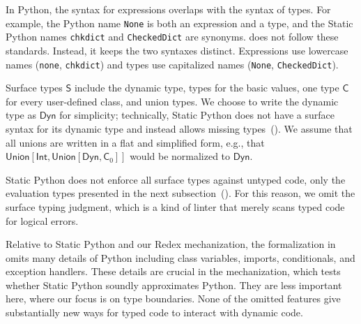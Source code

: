 \documentclass[english,cleveref,crc]{programming}
\newcommand{\SP}{Static Python}
\newcommand{\code}[1]{\texttt{#1}}
\newcommand{\typefont}[1]{\mathsf{#1}}
\newcommand{\paramtype}[2]{#1[#2]}
\newcommand{\sptype}{\typefont{S}}
\newcommand{\sptclass}{\typefont{C}}
\newcommand{\sptint}{\typefont{Int}}
\newcommand{\sptdyn}{\typefont{Dyn}}
\newcommand{\sptunion}[1]{\paramtype{\typefont{Union}}{#1}}
\begin{document}
In Python, the syntax for expressions overlaps with the syntax of types.
For example, the Python name \code{None} is both an expression and a type,
and the \SP{} names \code{chkdict} and \code{CheckedDict} are synonyms.
 does not follow these standards.
Instead, it keeps the two syntaxes distinct.
Expressions use lowercase names (\code{none}, \code{chkdict}) and types use capitalized
names (\code{None}, \code{CheckedDict}).

Surface types $\sptype$ include the dynamic type, types for the basic values, one type $\sptclass$ for every
user-defined class, and union types.
We choose to write the dynamic type as $\sptdyn$ for simplicity; technically,
\SP{} does not have a surface syntax for its dynamic
type and instead allows missing types~().
We assume that all unions are written in a flat and simplified form, e.g., that
$\sptunion{\sptint, \sptunion{\sptdyn, \sptclass_0}}$ would be normalized to $\sptdyn$.

\SP{} does not enforce all surface types against untyped code, only the evaluation
types presented in the next subsection~().
For this reason, we omit the surface typing judgment, which is a kind of linter
that merely scans typed code for logical errors.

Relative to \SP{} and our Redex mechanization, the formalization in  omits
many details of Python including class variables, imports, conditionals, and exception handlers.
These details are crucial in the mechanization, which tests whether \SP{}
soundly approximates Python.
They are less important here, where our focus is on type boundaries.
None of the omitted features give substantially new ways for typed code to interact with dynamic code.
\end{document}
